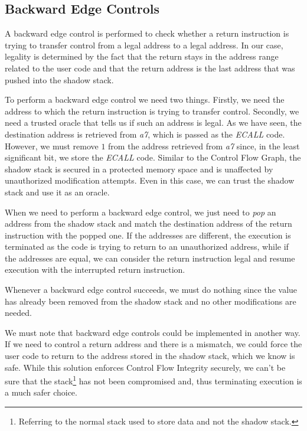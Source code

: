 \subsection{Backward Edge Controls}
\label{subsec:backward}

A backward edge control is performed to check whether a return instruction is trying
to transfer control from a legal address to a legal address. In our case, legality
is determined by the fact that the return stays in the address range related to the
user code and that the return address is the last address that was pushed into the
shadow stack.

To perform a backward edge control we need two things. Firstly, we need the address
to which the return instruction is trying to transfer control. Secondly, we need
a trusted oracle that tells us if such an address is legal. As we have seen, the
destination address is retrieved from \textit{a7}, which is passed as the \textit{ECALL}
code. However, we must remove $1$ from the address retrieved from \textit{a7} since,
in the least significant bit, we store the \textit{ECALL} code. Similar to the Control
Flow Graph, the shadow stack is secured in a protected memory space and is
unaffected by unauthorized modification attempts. Even in this case, we can
trust the shadow stack and use it as an oracle.

When we need to perform a backward edge control, we just need to \textit{pop} an
address from the shadow stack and match the destination address of the return
instruction with the popped one. If the addresses are different, the execution
is terminated as the code is trying to return to an unauthorized address, while if
the addresses are equal, we can consider the return instruction legal and resume
execution with the interrupted return instruction.

Whenever a backward edge control succeeds, we must do nothing since the value has
already been removed from the shadow stack and no other modifications are needed.

We must note that backward edge controls could be implemented in another way. If
we need to control a return address and there is a mismatch, we could force the user
code to return to the address stored in the shadow stack, which we know is safe.
While this solution enforces Control Flow Integrity securely, we can't be sure
that the stack\footnote{Referring to the normal stack used to store data and not
the shadow stack.} has not been compromised and, thus terminating execution is a
much safer choice.

